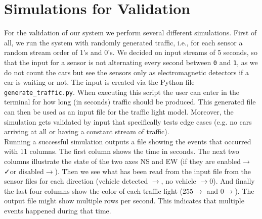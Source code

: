 \documentclass[10pt,bibliography=totocnumbered,listof=totocnumbered, footsepline, headsepline]{scrreprt}
\begin{document}
    
    
    
\section{Simulations for Validation}
For the validation of our system we perform several different simulations. First of all, we run the system with randomly generated traffic, i.e., for each sensor a random stream order of 1's and 0's. We decided on input streams of 5 seconds, so that the input for a sensor is not alternating every second between \texttt{0} and \texttt{1}, as we do not count the cars but see the sensors only as electromagnetic detectors if a car is waiting or not. The input is created via the Python file \texttt{generate\_traffic.py}. When executing this script the user can enter in the terminal for how long (in seconds) traffic should be produced. This generated file can then be used as an input file for the traffic light model. Moreover, the simulation gets validated by input that specifically tests edge cases (e.g. no cars arriving at all or having a constant stream of traffic).\\
Running a successful simulation outputs a file showing the events that occurred with 11 columns. The first column shows the time in seconds. The next two columns illustrate the state of the two axes NS and EW (if they are enabled$\rightarrow$\faCheck or disabled$\rightarrow$\faTimes). Then we see what has been read from the input file from the sensor files for each direction (vehicle detected $\rightarrow${\color{Blue}\faCar}, no vehicle $\rightarrow$0). And finally the last four columns show the color of each traffic light (255$\rightarrow${\color{Green}\faCircle} and 0$\rightarrow${\color{Red}\faCircle}). The output file might show multiple rows per second. This indicates that multiple events happened during that time.
\end{document}
